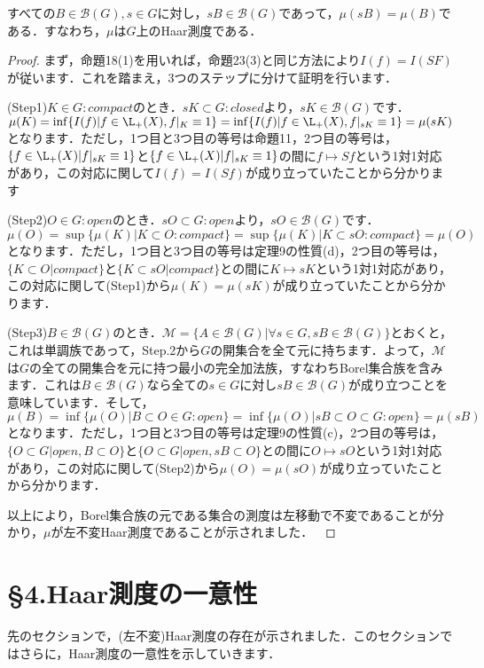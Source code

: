\begin{prop}
すべての$B \in \mathscr{B}(G), s \in G$に対し，$sB \in \mathscr{B}(G)$であって，$\mu(sB)=\mu(B)$である．すなわち，$\mu$は$G$上のHaar測度である．
\end{prop}
\begin{proof}
まず，命題18(1)を用いれば，命題23(3)と同じ方法により$I(f)=I(SF)$が従います．これを踏まえ，3つのステップに分けて証明を行います．

(Step1)$K \in G \colon compact$のとき．$sK \subset G \colon closed$より，$sK \in  \mathscr{B}(G)$です．$\mu(K)= \inf \{ I(f) | f \in \L_{+}(X), f|_{K} \equiv 1 \}=\inf \{ I(f) | f \in \L_{+}(X), f|_{sK} \equiv 1 \}=\mu(sK)$となります．ただし，1つ目と3つ目の等号は命題11，2つ目の等号は，$\{ f \in \L_{+}(X) | f|_{sK} \equiv 1 \}$と$\{ f \in \L_{+}(X) | f|_{sK} \equiv 1 \}$の間に$f \mapsto Sf$という1対1対応があり，この対応に関して$I(f)=I(Sf)$が成り立っていたことから分かります

(Step2)$O \in G \colon open$のとき．$sO \subset G \colon open$より，$sO \in \mathscr{B}(G)$です．$\mu(O)= \sup \{ \mu(K) | K \subset O \colon compact \}=\sup \{ \mu(K) | K \subset sO \colon compact \} = \mu (O)$となります．ただし，1つ目と3つ目の等号は定理9の性質(d)，2つ目の等号は，$\{ K \subset O | compact \}$と$\{ K \subset sO | compact \}$との間に$K \mapsto sK$という1対1対応があり，この対応に関して(Step1)から$\mu(K)=\mu(sK)$が成り立っていたことから分かります．

(Step3)$B \in \mathscr{B}(G)$のとき．$\mathscr{M}=\{A \in \mathscr{B}(G) | \forall s \in G , sB \in \mathscr{B}(G) \}$とおくと，これは単調族であって，Step.2から$G$の開集合を全て元に持ちます．よって，$\mathscr{M}$は$G$の全ての開集合を元に持つ最小の完全加法族，すなわちBorel集合族を含みます．これは$B \in \mathscr{B}(G)$なら全ての$s \in G$に対し$ sB \in \mathscr{B}(G)$が成り立つことを意味しています．そして，$\mu(B)= \inf \{ \mu(O) | B \subset O \in G \colon open\}= \inf \{ \mu(O) | sB \subset O \subset G \colon open\} = \mu(sB)$となります．ただし，1つ目と3つ目の等号は定理9の性質(c)，2つ目の等号は，$\{ O \subset G | open, B \subset O \}$と$\{ O \subset G | open, sB \subset O \}$との間に$O \mapsto sO$という1対1対応があり，この対応に関して(Step2)から$\mu(O)=\mu(sO)$が成り立っていたことから分かります．

以上により，Borel集合族の元である集合の測度は左移動で不変であることが分かり，$\mu$が左不変Haar測度であることが示されました．　
\end{proof}
\section{\S 4.Haar測度の一意性}
先のセクションで，(左不変)Haar測度の存在が示されました．このセクションではさらに，Haar測度の一意性を示していきます．

